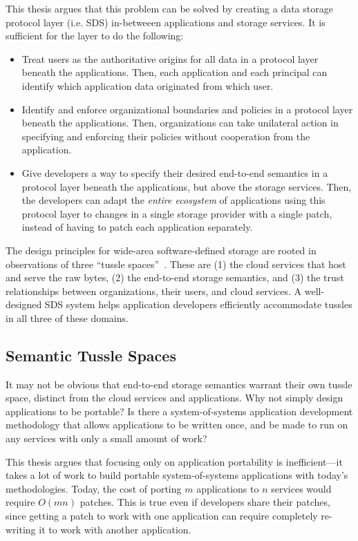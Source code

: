 This thesis argues that this problem can be solved by creating a data storage
protocol layer (i.e. SDS) in-betweeen applications and storage services.  It is sufficient
for the layer to do the following:

\begin{itemize}
   \item Treat users as the authoritative origins for all data in a protocol
      layer beneath the applications.  Then, each application and each principal
      can identify which application data originated from which user.
   \item Identify and enforce organizational boundaries and policies in a protocol layer
      beneath the applications.  Then, organizations can take unilateral action
      in specifying and enforcing their policies without cooperation from the
      application.
   \item Give developers a way to specify their desired end-to-end semantics in
      a protocol layer beneath the applications, but above the storage services.
      Then, the developers can adapt the \emph{entire ecosystem} of applications
      using this protocol layer to changes in a single storage provider with a
      single patch, instead of having to patch each application separately.
\end{itemize}

The design principles for wide-area software-defined storage are rooted in 
observations of three ``tussle spaces''~\cite{david-clark-tussle-spaces}.
These are (1) the cloud services that host and serve the raw
bytes, (2) the end-to-end storage semantics, and (3) the trust
relationships between organizations, their users, and cloud services.
A well-designed SDS system helps application developers efficiently accommodate tussles
in all three of these domains.

\subsection{Semantic Tussle Spaces}

It may not be obvious that end-to-end storage semantics warrant their own tussle
space, distinct from the cloud services and applications.  Why not simply
design applications to be portable?  Is there a system-of-systems application
development methodology that allows applications to be written once, and be made
to run on any services with only a small amount of work?

This thesis argues that focusing only on application portability is
inefficient---it takes a lot of work to build portable system-of-systems
applications with today's methodologies.
Today, the cost of porting $m$ applications to $n$ services
would require $O(mn)$ patches.  This is true even if developers share their
patches, since getting a patch to work with one application can require completely
re-writing it to work with another application.

